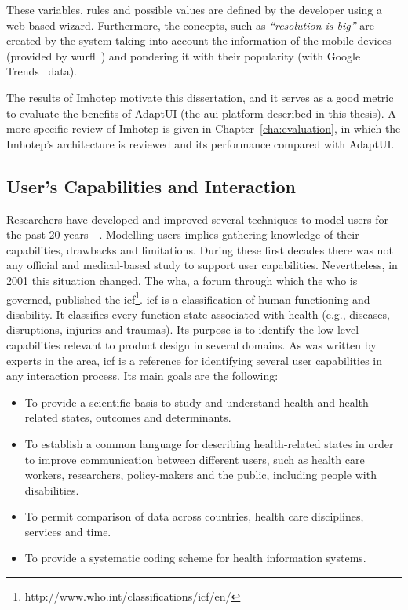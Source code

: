 \inputminted[linenos=true, fontsize=\footnotesize, frame=lines]{java}{5_experiments_and_results/imhotep_pseudocode.txt}

These variables, rules and possible values are defined by the developer using a
web based wizard. Furthermore, the concepts, such as \textit{``resolution is 
big''} are created by the system taking into account the information of the mobile
devices (provided by \ac{wurfl}~\citep{wurfl}) and pondering it with their 
popularity (with Google Trends~\citep{trends} data).

The results of Imhotep motivate this dissertation, and it serves as a good metric
to evaluate the benefits of AdaptUI (the \ac{aui} platform described in this thesis). 
A more specific review of Imhotep is given in Chapter~\ref{cha:evaluation}, in 
which the Imhotep's architecture is reviewed and its performance compared with 
AdaptUI.


\subsection{User's Capabilities and Interaction}
\label{sec:background_icf}

Researchers have developed and improved several techniques to model users for 
the past 20 years~\citep{petrelli_user_centered_1999}~\citep{fink_adaptable_1997}. 
Modelling users implies gathering knowledge of their capabilities, drawbacks 
and limitations. During these first decades there was not any official and 
medical-based study to support user capabilities. Nevertheless, in 2001 
this situation changed. The \ac{wha}, a forum through which the \ac{who} is
governed, published the \ac{icf}\footnote{http://www.who.int/classifications/icf/en/}. 
\ac{icf} is a classification of human functioning and disability. It 
classifies every function state associated with health (e.g., diseases, 
disruptions, injuries and traumas). Its purpose is to identify the low-level 
capabilities relevant to product design in several domains. As was written by 
experts in the area, \ac{icf} is a reference for identifying several user 
capabilities in any interaction process. Its main goals are the following:

\begin{itemize}
  \item To provide a scientific basis to study and understand health and
  health-related states, outcomes and determinants.
  \item To establish a common language for describing health-related states in 
  order to improve communication between different users, such as health care 
  workers, researchers, policy-makers and the public, including people with 
  disabilities.
  \item To permit comparison of data across countries, health care disciplines,
  services and time.
  \item To provide a systematic coding scheme for health information systems.
\end{itemize}

